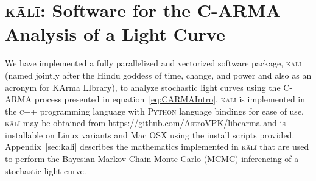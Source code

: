 \documentclass[a4paper,fleqn,usenatbib]{mnras}
\begin{document}



\section[\textsc{k\={a}l\={i}}]{\textsc{k\={a}l\={i}}: Software for the C-ARMA Analysis of a Light Curve}\label{sec:Steps}

We have implemented a fully parallelized and vectorized software package, \textsc{k\={a}l\={i}} (named jointly after the Hindu goddess of time, change, and power and also as an acronym for KArma LIbrary), to analyze stochastic light curves using the C-ARMA process presented in equation~\eqref{eq:CARMAIntro}. \textsc{k\={a}l\={i}} is implemented in the \textsc{c++} programming language with \textsc{Python} language bindings for ease of use. \textsc{k\={a}l\={i}} may be obtained from \url{https://github.com/AstroVPK/libcarma} and is installable on Linux variants and Mac OSX using the install scripts provided. Appendix~\ref{sec:kali} describes the mathematics implemented in \textsc{k\={a}l\={i}} that are used to perform the Bayesian Markov Chain Monte-Carlo (MCMC) inferencing of a stochastic light curve.
\end{document}

